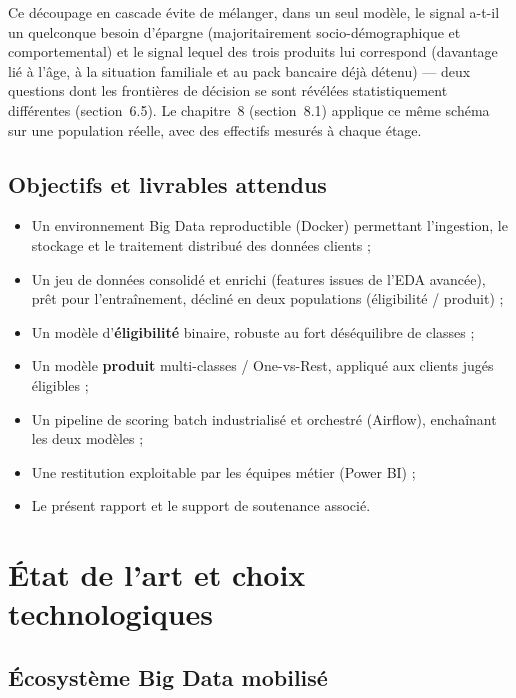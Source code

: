 \documentclass[11pt,a4paper]{report}
\begin{document}
Ce découpage en cascade évite de mélanger, dans un seul modèle, le signal
\og a-t-il un quelconque besoin d'épargne \fg{} (majoritairement
socio-démographique et comportemental) et le signal \og lequel des trois
produits lui correspond \fg{} (davantage lié à l'âge, à la situation
familiale et au pack bancaire déjà détenu) — deux questions dont les
frontières de décision se sont révélées statistiquement différentes
(section~6.5). Le chapitre~8 (section~8.1) applique ce même schéma sur
une population réelle, avec des effectifs mesurés à chaque étage.

\section{Objectifs et livrables attendus}
\begin{itemize}
  \item Un environnement Big Data reproductible (Docker) permettant
  l'ingestion, le stockage et le traitement distribué des données clients ;
  \item Un jeu de données consolidé et enrichi (features issues de l'EDA
  avancée), prêt pour l'entraînement, décliné en deux populations
  (éligibilité / produit) ;
  \item Un modèle d'\textbf{éligibilité} binaire, robuste au fort
  déséquilibre de classes ;
  \item Un modèle \textbf{produit} multi-classes / One-vs-Rest, appliqué
  aux clients jugés éligibles ;
  \item Un pipeline de scoring batch industrialisé et orchestré (Airflow),
  enchaînant les deux modèles ;
  \item Une restitution exploitable par les équipes métier (Power BI) ;
  \item Le présent rapport et le support de soutenance associé.
\end{itemize}


\chapter{État de l'art et choix technologiques}
\statutFait

\section{Écosystème Big Data mobilisé}
\end{document}
